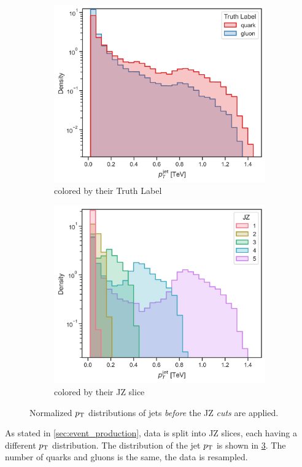 \begin{figure}[htb]
    \centering
    \begin{subfigure}[t]{0.49\textwidth}
        \centering
        \includegraphics[width=\linewidth]{src/plots/pt_jet_label.jpg}
        \caption{colored by their Truth Label}
        \label{fig:jz_all_label}
    \end{subfigure}
    \begin{subfigure}[t]{0.49\textwidth}
        \centering
        \includegraphics[width=\linewidth]{src/plots/pt_jet_jz.jpg}
        \caption{colored by their JZ slice}
        \label{fig:jz_all_jz}
    \end{subfigure}
    \caption{Normalized $p_\text{T}$ distributions of jets \emph{before} the JZ \emph{cuts} are applied.}
    \label{fig:jz_all}
\end{figure}
As stated in \cref{sec:event_production}, data is split into JZ slices, each having a different $p_\text{T}$ distribution.
The distribution of the jet $p_\text{T}$ is shown in \cref{fig:jz_all}.
The number of quarks and gluons is the same, the data is resampled.

